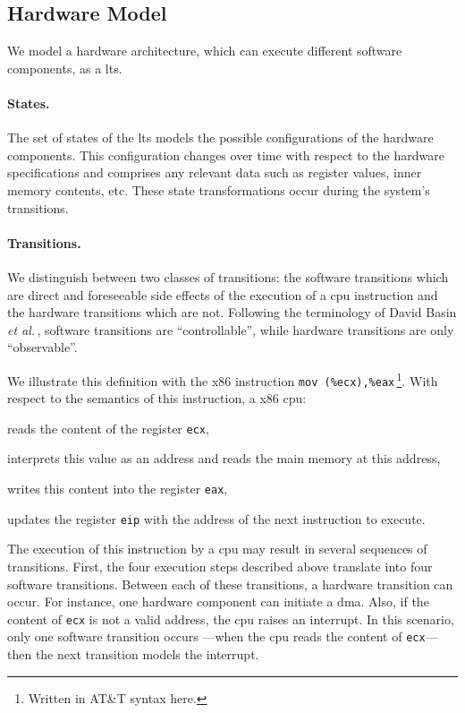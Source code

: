 \subsection{Hardware Model}
\label{subsec:speccert:hardware}

We model a hardware architecture, which can execute different software
components, as a \ac{lts}.

\paragraph{States.}
%
The set of states of the \ac{lts} models the possible configurations of the
hardware components.
%
This configuration changes over time with respect to the hardware specifications
and comprises any relevant data such as register values, inner memory contents,
etc.
%
These state transformations occur during the system's transitions.

\paragraph{Transitions.}
%
We distinguish between two classes of transitions: the software transitions
which are direct and foreseeable side effects of the execution of a \ac{cpu}
instruction and the hardware transitions which are not.
%
Following the terminology of David Basin \emph{et
  al.}\,\cite{basin2013enforceable}, software transitions are ``controllable'',
while hardware transitions are only ``observable''.

We illustrate this definition with the x86 instruction \texttt{mov
  (\%ecx),\%eax}\,\footnote{Written in AT\&T syntax here.}.
%
With respect to the semantics of this instruction, a x86 \ac{cpu}:
%
\begin{inparaenum}[(1)]
\item reads the content of the register \texttt{ecx},
%
\item interprets this value as an address and reads the main memory at this
  address,
%
\item writes this content into the register \texttt{eax},
%
\item updates the register \texttt{eip} with the address of the next instruction
  to execute.
\end{inparaenum}
%
The execution of this instruction by a \ac{cpu} may result in several sequences
of transitions.
%
First, the four execution steps described above translate into four software
transitions.
%
Between each of these transitions, a hardware transition can occur.
%
For instance, one hardware component can initiate a \ac{dma}.
%
Also, if the content of \texttt{ecx} is not a valid address, the \ac{cpu} raises
an interrupt.
%
In this scenario, only one software transition occurs ---when the \ac{cpu} reads
the content of \texttt{ecx}--- then the next transition models the interrupt.


